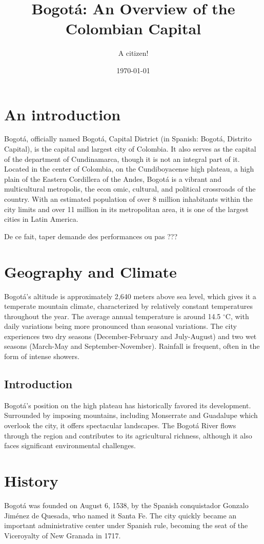 \documentclass{article}
\title{Bogotá: An Overview of the Colombian Capital}
\author{A citizen!}
\date{\today}
\begin{document}
\maketitle

\section{An introduction}
Bogotá, officially named Bogotá, Capital District (in Spanish: Bogotá, Distrito Capital), is the capital and largest city of Colombia. It also serves as the capital of the department of Cundinamarca, though it is not an integral part of it. Located in the center of Colombia, on the Cundiboyacense high plateau, a high plain of the Eastern Cordillera of the Andes, Bogotá is a vibrant and multicultural metropolis, the econ
omic, cultural, and political crossroads of the country. With an estimated population of over 8 million inhabitants within the city limits and over 11 million in its metropolitan area, it is one of the largest cities in Latin America.

De ce fait, taper demande des performances ou pas ???



\section{Geography and Climate}
Bogotá's altitude is approximately 2,640 meters above sea level, which gives it a temperate mountain climate, characterized by relatively constant temperatures throughout the year. The average annual temperature is around 14.5 $^\circ$C, with daily variations being more pronounced than seasonal variations. The city experiences two dry seasons (December-February and July-August) and two wet seasons (March-May and September-November). Rainfall is frequent, often in the form of intense showers.

\subsection{Introduction}
Bogotá's position on the high plateau has historically favored its development. Surrounded by imposing mountains, including Monserrate and Guadalupe which overlook the city, it offers spectacular landscapes. The Bogotá River flows through the region and contributes to its agricultural richness, although it also faces significant environmental challenges.

\section{History}
Bogotá was founded on August 6, 1538, by the Spanish conquistador Gonzalo Jiménez de Quesada, who named it Santa Fe. The city quickly became an important administrative center under Spanish rule, becoming the seat of the Viceroyalty of New Granada in 1717.
\end{document}
